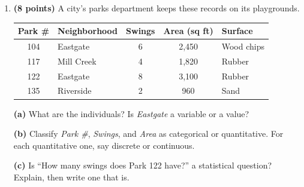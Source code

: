 \documentclass[12pt]{article}
\begin{document}
\vspace{0.06in}

\begin{enumerate}[leftmargin=1.9em, itemsep=0.10in, resume]

  \boxguard[22]
  \item \textbf{(8 points)} A city's parks department keeps these records on its playgrounds.

        \vspace{3pt}
        {\centering\small
        \renewcommand{\arraystretch}{1.05}
        \begin{tabular}{@{} c l c c l @{}}
        \textbf{Park \#} & \textbf{Neighborhood} & \textbf{Swings} & \textbf{Area (sq ft)} &
        \textbf{Surface} \\ \hline
        104 & Eastgate   & 6 & 2,450 & Wood chips \\
        117 & Mill Creek & 4 & 1,820 & Rubber \\
        122 & Eastgate   & 8 & 3,100 & Rubber \\
        135 & Riverside  & 2 & 960   & Sand \\
        \end{tabular}\par}

        \vspace{3pt}
        \textbf{(a)} What are the individuals? Is \emph{Eastgate} a variable or a value?\\[2pt]

        \boxguard[15]
        \vspace{3pt}
        \textbf{(b)} Classify \emph{Park \#}, \emph{Swings}, and \emph{Area} as categorical or
        quantitative. For each quantitative one, say discrete or continuous.\\[2pt]

        \boxguard[15]
        \vspace{3pt}
        \textbf{(c)} Is ``How many swings does Park 122 have?'' a statistical question? Explain,
        then write one that is.\\[2pt]


\end{enumerate}
\end{document}

